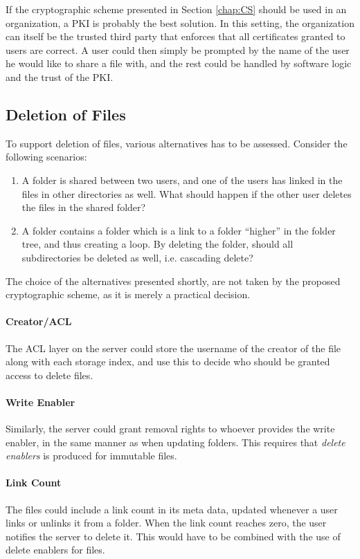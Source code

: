 \documentclass[pdftex,english,10pt,b5paper,twoside]{book}
\begin{document}
If the cryptographic scheme presented in Section \ref{chap:CS} should be used
in an organization, a \ac{PKI} is probably the best solution. In this setting,
the organization can itself be the trusted third party that enforces that all
certificates granted to users are correct. A user could then simply be prompted
by the name of the user he would like to share a file with, and the rest could
be handled by software logic and the trust of the \ac{PKI}.

\subsection{Deletion of Files}
\label{sec:deletion_of_files}
To support deletion of files, various alternatives has to be assessed.
Consider the following scenarios:

\begin{enumerate}
  \item A folder is shared between two users, and one of the users has
    linked in the files in other directories as well. What should happen if the
    other user deletes the files in the shared folder?

  \item A folder contains a folder which is a link to a folder ``higher''
    in the folder tree, and thus creating a loop. By deleting the folder,
    should all subdirectories be deleted as well, i.e. cascading delete?
\end{enumerate}

The choice of the alternatives presented shortly, are not taken by the proposed
cryptographic scheme, as it is merely a practical decision.

\paragraph{Creator/\ac{ACL}} The \ac{ACL} layer on the server could store the
username of the creator of the file along with each storage index, and use this
to decide who should be granted access to delete files.

\paragraph{Write Enabler} Similarly, the server could grant removal rights to
whoever provides the write enabler, in the same manner as when updating
folders. This requires that \emph{delete enablers} is produced for immutable
files.

\paragraph{Link Count} The files could include a link count in its meta data,
updated whenever a user links or unlinks it from a folder. When the link count
reaches zero, the user notifies the server to delete it. This would have to be
combined with the use of delete enablers for files.
\end{document}
